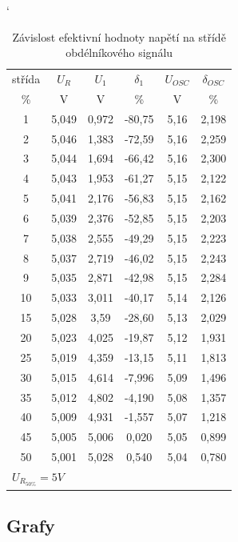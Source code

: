 \documentclass[a4paper, czech]{article}
\begin{document}
\begin{table}[H]
    \catcode`
    \centering
    \caption{Závislost efektivní hodnoty napětí na střídě obdélníkového signálu}
    \begin{tabular}{cccccc}
        \toprule
        střída & $U_R$    & $U_1$    & $\delta_1$     & $U_{OSC}$ & $\delta_{OSC}$  \\
        \cmidrule(rl){1-1}
        \cmidrule(rl){2-2}
        \cmidrule(rl){3-4}
        \cmidrule(rl){5-6}
        \%     & V     & V     & \%     & V    & \%    \\
        \midrule
        1      & 5,049 & 0,972 & -80,75 & 5,16 & 2,198 \\
        2      & 5,046 & 1,383 & -72,59 & 5,16 & 2,259 \\
        3      & 5,044 & 1,694 & -66,42 & 5,16 & 2,300 \\
        4      & 5,043 & 1,953 & -61,27 & 5,15 & 2,122 \\
        5      & 5,041 & 2,176 & -56,83 & 5,15 & 2,162 \\
        6      & 5,039 & 2,376 & -52,85 & 5,15 & 2,203 \\
        7      & 5,038 & 2,555 & -49,29 & 5,15 & 2,223 \\
        8      & 5,037 & 2,719 & -46,02 & 5,15 & 2,243 \\
        9      & 5,035 & 2,871 & -42,98 & 5,15 & 2,284 \\
        10     & 5,033 & 3,011 & -40,17 & 5,14 & 2,126 \\
        15     & 5,028 & 3,59  & -28,60 & 5,13 & 2,029 \\
        20     & 5,023 & 4,025 & -19,87 & 5,12 & 1,931 \\
        25     & 5,019 & 4,359 & -13,15 & 5,11 & 1,813 \\
        30     & 5,015 & 4,614 & -7,996 & 5,09 & 1,496 \\
        35     & 5,012 & 4,802 & -4,190 & 5,08 & 1,357 \\
        40     & 5,009 & 4,931 & -1,557 & 5,07 & 1,218 \\
        45     & 5,005 & 5,006 & 0,020  & 5,05 & 0,899 \\
        50     & 5,001 & 5,028 & 0,540  & 5,04 & 0,780 \\
        \bottomrule
        \multicolumn{6}{l}{$U_{R_{50\%}} = 5V$}
    \end{tabular}
\end{table}

\subsection{Grafy}
\end{document}
